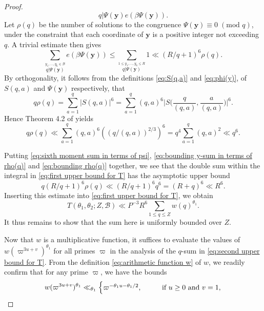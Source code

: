 \documentclass[12pt,english,reqno]{amsart}
\theoremstyle{definition}
\theoremstyle{remark}
\numberwithin{equation}{section}
\numberwithin{equation}{section}
\numberwithin{figure}{section}
\theoremstyle{plain}
\theoremstyle{plain}
\theoremstyle{plain}
\theoremstyle{plain}
\numberwithin{equation}{section}
\numberwithin{thm}{section}
\begin{document}
\begin{proof}
\begin{equation}
{{q|\Psi(\boldsymbol{y})}
}e(\beta\Psi(\boldsymbol{y})).\label{eq:sixth moment sum in terms of psi}\end{equation}
Let $\rho(q)$ be the number of solutions to the congruence $\Psi(\boldsymbol{y})\equiv0\;(\text{mod }q)$,
under the constraint that each coordinate of $\boldsymbol{y}$ is
a positive integer not exceeding $q$. A trivial estimate then gives
\begin{equation}
\sum_{\stackrel{y_{1},...,y_{6}\in\mathcal{B}}{q|\Psi(\boldsymbol{y})}}e(\beta\Psi(\boldsymbol{y}))\leq\sum_{\stackrel{1\leq y_{1},...,y_{6}\leq R}{q|\Psi(\boldsymbol{y})}}1\ll(R/q+1)^{6}\rho(q).\label{eq:bounding y-sum in terms of rho(q)}\end{equation}
By orthogonality, it follows from the definitions \eqref{eq:S(q,a)}
and \eqref{eq:phi(y)}, of $S(q,a)$ and $\Psi(\boldsymbol{y})$ respectively,
that
\[
q\rho(q)=\sum_{a=1}^{q}|S(q,a)|^{6}=\sum_{a=1}^{q}(q,a)^{6}\Big|S\Big(\frac{q}{(q,a)},\frac{a}{(q,a)}\Big)\Big|^{6}.\]
Hence Theorem 4.2 of \cite{vaughan1997} yields
\begin{equation}
q\rho(q)\ll\sum_{a=1}^{q}(q,a)^{6}((q/(q,a))^{2/3})^{6}=q^{4}\sum_{a=1}^{q}(q,a)^{2}\ll q^{6}.\label{eq:bounding rho(q)}\end{equation}
\par Putting \eqref{eq:sixth moment sum in terms of psi},
\eqref{eq:bounding y-sum in terms of rho(q)} and \eqref{eq:bounding rho(q)}
together, we see that the double sum within the integral in \eqref{eq:first upper bound for T}
has the asymptotic upper bound
\[
q(R/q+1)^{6}\rho(q)\ll(R/q+1)^{6}q^{6}=(R+q)^{6}\ll R^{6}.\]
Inserting this estimate into \eqref{eq:first upper bound for T},
we obtain
\begin{equation}
T(\theta_1,\theta_2;Z,\mathcal{B})\ll P^{-3}R^{6}\sum_{1\leq q\leq Z}w(q)^{\theta_1}.\label{eq:second upper bound for T}\end{equation}
It thus remains to show that the sum here is uniformly bounded over $Z$.
\par Now that $w$ is a multiplicative function, it suffices to evaluate the values
of $w(\varpi^{3u+v})^{\theta_1}$ for all primes $\varpi$ in the analysis
of the $q$-sum in \eqref{eq:second upper bound for T}. From the
definition \eqref{eq:arithmetic function w} of $w$, we readily confirm
that for any prime $\varpi$, we have the bounds
\[
w(\varpi^{3u+v})^{\theta_1}\ll_{\theta_1}\begin{cases}
\varpi^{-\theta_1u-\theta_1/2},\qquad & \text{if }u\geq0\mbox{\text{ and }}v=1,\\

\end{cases}\]
\end{proof}
\end{document}
